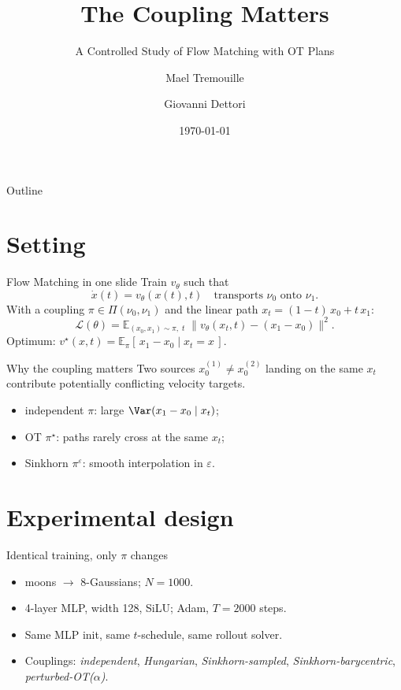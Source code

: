 \documentclass[10pt, aspectratio=169]{beamer}
\title{The Coupling Matters}
\subtitle{A Controlled Study of Flow Matching with OT Plans}
\author{Mael Tremouille \and Giovanni Dettori}
\institute{ENSAE Paris --- M2 Optimal Transport}
\date{\today}
\begin{document}
\maketitle

\begin{frame}{Outline}
    \tableofcontents
\end{frame}

\section{Setting}

\begin{frame}{Flow Matching in one slide}
    Train $v_\theta$ such that
    \[
        \dot x(t) = v_\theta(x(t), t)
        \quad\text{transports }\nu_0 \text{ onto } \nu_1.
    \]
    With a coupling $\pi \in \Pi(\nu_0, \nu_1)$ and the linear path
    $x_t = (1-t)\,x_0 + t\,x_1$:
    \[
        \mathcal L(\theta) = \mathbb E_{(x_0, x_1) \sim \pi,\; t}\;
        \| v_\theta(x_t, t) - (x_1 - x_0) \|^2.
    \]
    Optimum: $v^\star(x, t) = \mathbb E_\pi[\,x_1 - x_0 \mid x_t = x\,]$.
\end{frame}

\begin{frame}{Why the coupling matters}
    Two sources $x_0^{(1)} \neq x_0^{(2)}$ landing on the same $x_t$
    contribute potentially conflicting velocity targets.
    \begin{itemize}
        \item independent $\pi$: large $\Var(x_1 - x_0 \mid x_t)$;
        \item OT $\pi^\star$: paths rarely cross at the same $x_t$;
        \item Sinkhorn $\pi^\varepsilon$: smooth interpolation in $\varepsilon$.
    \end{itemize}
\end{frame}

\section{Experimental design}

\begin{frame}{Identical training, only $\pi$ changes}
    \begin{itemize}
        \item moons $\to$ 8-Gaussians; $N = 1000$.
        \item 4-layer MLP, width 128, SiLU; Adam, $T = 2000$ steps.
        \item Same MLP init, same $t$-schedule, same rollout solver.
        \item Couplings: \emph{independent}, \emph{Hungarian}, \emph{Sinkhorn-sampled},
              \emph{Sinkhorn-barycentric}, \emph{perturbed-OT($\alpha$)}.
    \end{itemize}
\end{frame}
\end{document}
